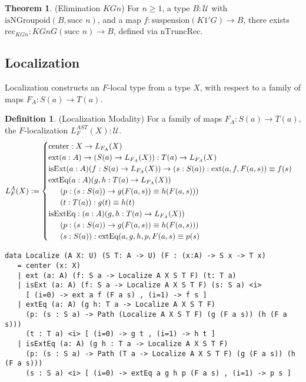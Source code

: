 \documentclass{article}
\theoremstyle{definition}
\newtheorem{theorem}{Theorem}
\newtheorem{definition}{Definition}
\begin{document}
\begin{theorem} (Elimination \( KGn \))
For \( n \geq 1 \), a type \( B : \mathcal{U} \) with \( \text{isNGroupoid}(B, \text{succ } n) \),
and a map \( f : \text{suspension}(K1' G) \to B \), there exists
\( \text{rec}_{KGn} : KGn G (\text{succ } n) \to B \),
defined via \( \text{nTruncRec} \).
\end{theorem}

\newpage
\subsection{Localization}
Localization constructs an \( F \)-local type from a type \( X \),
with respect to a family of maps \( F_A : S(a) \to T(a) \).

\begin{definition} (Localization Modality)
For a family of maps \( F_A : S(a) \to T(a) \),
the \( F \)-localization \( L^{AST}_F(X) : \mathcal{U} \).
\[
L^A_F(X) :=
\begin{cases}
\text{center} : X \to L_{F_A}(X) \\
\text{ext} (a : A) \to (S(a) \to L_{F_A}(X)) : T(a) \to L_{F_A}(X) \\
\text{isExt} (a : A) (f : S(a) \to L_{F_A}(X)) \to (s : S(a)) : \text{ext}(a,f,F(a,s)) \equiv f(s) \\
\text{extEq} (a : A) (g, h : T(a) \to L_{F_A}(X)) \\
\indent (p : (s : S(a)) \to g(F(a,s)) \equiv h(F(a,s))) \\
\indent (t : T(a)) : g(t) \equiv h(t) \\
\text{isExtEq} : (a : A) (g, h : T(a) \to L_{F_A}(X)) \\
\indent  (p : (s : S(a)) \to g(F(a,s)) \equiv h(F(a,s))) \\
\indent (s : S(a)) : \text{extEq}(a,g,h,p,F(a,s) \equiv p(s)
\end{cases}
\]
\begin{lstlisting}
data Localize (A X: U) (S T: A -> U) (F : (x:A) -> S x -> T x)
   = center (x: X)
   | ext (a: A) (f: S a -> Localize A X S T F) (t: T a)
   | isExt (a: A) (f: S a -> Localize A X S T F) (s: S a) <i>
     [ (i=0) -> ext a f (F a s) , (i=1) -> f s ]
   | extEq (a: A) (g h: T a -> Localize A X S T F)
     (p: (s : S a) -> Path (Localize A X S T F) (g (F a s)) (h (F a s)))
     (t : T a) <i> [ (i=0) -> g t , (i=1) -> h t ]
   | isExtEq (a: A) (g h : T a -> Localize A X S T F)
     (p: (s : S a) -> Path (T a -> Localize A X S T F) (g (F a s)) (h (F a s)))
     (s : S a) <i> [ (i=0) -> extEq a g h p (F a s) , (i=1) -> p s ]
\end{lstlisting}
\end{definition}
\end{document}
